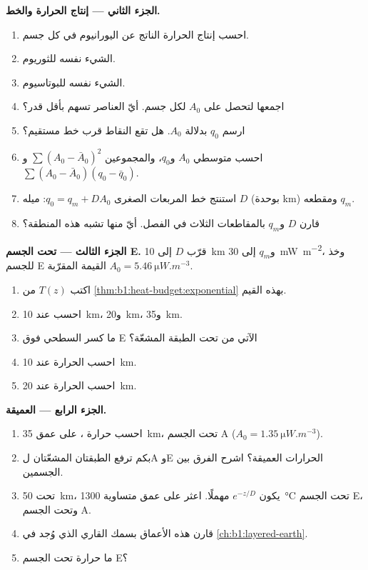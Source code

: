 \begin{problem}
\noindent\textbf{الجزء الثاني --- إنتاج الحرارة والخط.}
\begin{enumerate}[resume]
  \item احسب إنتاج الحرارة الناتج عن اليورانيوم في كل جسم.
  \item الشيء نفسه للثوريوم.
  \item الشيء نفسه للبوتاسيوم.
  \item اجمعها لتحصل على $A_0$ لكل جسم. أيّ العناصر تسهم بأقل قدر؟
  \item ارسم $q_0$ بدلالة $A_0$. هل تقع النقاط قرب خط مستقيم؟
  \item احسب متوسطي $A_0$ و$q_0$، والمجموعين $\sum (A_0 - \bar A_0)^2$ و$\sum (A_0 - \bar A_0)(q_0 - \bar q_0)$.
  \item استنتج خط المربعات الصغرى $q_0 = q_m + D A_0$: ميله $D$ (بوحدة \unit{km}) ومقطعه $q_m$.
  \item قارن $D$ و$q_m$ بالمقاطعات الثلاث في الفصل. أيّ منها تشبه هذه المنطقة؟
\end{enumerate}

\noindent\textbf{الجزء الثالث ---  تحت الجسم E.}
قرّب $D$ إلى \qty{10}{km} و$q_m$ إلى \qty{30}{mW.m^{-2}}، وخذ للجسم E القيمة المقرّبة $A_0 = \qty{5.46}{\micro W.m^{-3}}$.
\begin{enumerate}[resume]
  \item اكتب  $T(z)$ من \cref{thm:b1:heat-budget:exponential} بهذه القيم.
  \item احسب  عند \qty{10}{km}، و\qty{20}{km}، و\qty{35}{km}.
  \item ما كسر  السطحي فوق E الآتي من تحت الطبقة المشعّة؟
  \item احسب الحرارة عند \qty{10}{km}.
  \item احسب الحرارة عند \qty{20}{km}.
\end{enumerate}

\noindent\textbf{الجزء الرابع ---  العميقة.}
\begin{enumerate}[resume]
  \item احسب حرارة ، على عمق \qty{35}{km}، تحت الجسم A ($A_0 = \qty{1.35}{\micro W.m^{-3}}$).
  \item بكم ترفع الطبقتان المشعّتان لA وE الحرارات العميقة؟ اشرح الفرق بين الجسمين.
  \item تحت \qty{50}{km}، يكون $e^{-z/D}$ مهملًا. اعثر على عمق متساوية \qty{1300}{\degreeCelsius} تحت الجسم E، وتحت الجسم A.
  \item قارن هذه الأعماق بسمك  القاري الذي وُجد في \cref{ch:b1:layered-earth}.
  \item ما حرارة  تحت الجسم E؟
\end{enumerate}
\end{problem}
